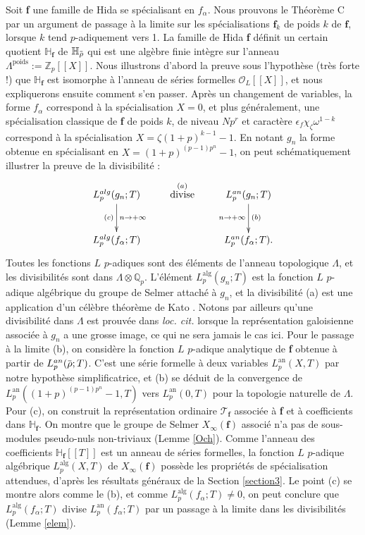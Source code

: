 \documentclass[12pt]{amsart}
\newcommand\bH{\mathbb{H}}
\newcommand\Zp{{\mathbb{Z}_{p}}}
\newcommand\Qp{\mathbb{Q}_{p}}
\newcommand\cO{\mathcal{O}}
\newcommand\cT{\mathcal{T}}
\newcommand{\ob}[1]{\mkern 1.5mu\overline{\mkern-1.5mu#1\mkern-1.5mu}\mkern 1.5mu}
\newcommand{\an}{\textrm{an}}
\newcommand{\alg}{\textrm{alg}}
\theoremstyle{defstyle}
\theoremstyle{thmstyle}
\begin{document}
Soit \textbf{f} une famille de Hida se spécialisant en $f_\alpha$. Nous prouvons le Théorème C par un argument de passage à la limite sur les spécialisations $\textbf{f}_k$ de poids $k$ de $\textbf{f}$, lorsque $k$ tend $p$-adiquement vers 1. La famille de Hida \textbf{f} définit un certain quotient $\bH_{\textbf{f}}$ de $\bH_{\ob{\rho}}$ qui est une algèbre finie intègre sur l'anneau $\Lambda^\textrm{poids}:=\Zp[[X]]$. Nous illustrons d'abord la preuve sous l'hypothèse (très forte !) que $\bH_{\textbf{f}}$ est isomorphe à l'anneau de séries formelles $\cO_L[[X]]$, et nous expliquerons ensuite comment s'en passer. Après un changement de variables, la forme $f_\alpha$ correspond à la spécialisation $X=0$, et plus généralement, une spécialisation classique de \textbf{f} de poids $k$, de niveau $Np^r$ et caractère $\epsilon_{f}\chi_\zeta\omega^{1-k}$ correspond à la spécialisation $X=\zeta (1+p)^{k-1}-1$. En notant $g_n$ la forme obtenue en spécialisant en $X=(1+p)^{(p-1)p^n}-1$, on peut schématiquement illustrer la preuve de la divisibilité :
$$
\xymatrix{
	L_p^{\alg}(g_n;T) \ar[d]_{(c)}^{n \rightarrow +\infty} & \stackrel{(a)}{\mbox{divise}} & L_p^{\an}(g_n;T) \ar[d]^{(b)}_{n \rightarrow +\infty} \\
	L_p^{\alg}(f_\alpha;T) & & L_p^{\an}(f_\alpha;T).
}
$$ 
Toutes les fonctions $L$ $p$-adiques sont des éléments de l'anneau topologique $\Lambda$, et les divisibilités sont dans $\Lambda\otimes \Qp$. L'élément $L_p^{\alg}(g_n;T)$ est la fonction $L$ $p$-adique algébrique du groupe de Selmer attaché à $g_n$, et la divisibilité (a) est une application d'un célèbre théorème de Kato \cite[Theorem 17.4]{kato2004p}. Notons par ailleurs qu'une divisibilité dans $\Lambda$ est prouvée dans \textit{loc. cit.} lorsque la représentation galoisienne associée à $g_n$ a une grosse image, ce qui ne sera jamais le cas ici. Pour le passage à la limite (b), on considère la fonction $L$ $p$-adique analytique de \textbf{f} obtenue à partir de $L_p^{\an}(\ob{\rho};T)$.  C'est une série formelle à deux variables $L_p^{\an}(X,T)$ par notre hypothèse simplificatrice, et (b) se déduit de la convergence de $L_p^{\an}((1+p)^{(p-1)p^n}-1,T)$ vers $L_p^{\an}(0,T)$ pour la topologie naturelle de $\Lambda$. Pour (c), on construit la représentation ordinaire $\cT_\textbf{f}$ associée à \textbf{f} et à coefficients dans $\bH_\textbf{f}$. On montre que le groupe de Selmer $X_\infty(\textbf{f})$ associé n'a pas de sous-modules pseudo-nuls non-triviaux (Lemme \ref{Och}). Comme l'anneau des coefficients $\bH_\textbf{f}[[T]]$ est un anneau de séries formelles, la fonction $L$ $p$-adique algébrique $L_p^{\alg}(X,T)$ de $X_\infty(\textbf{f})$ possède les propriétés de spécialisation attendues, d'après les résultats généraux de la Section \ref{section3}. Le point (c) se montre alors comme le (b), et comme $L_p^{\alg}(f_\alpha;T)\neq 0$, on peut conclure que $L_p^{\alg}(f_\alpha;T)$ divise $L_p^{\an}(f_\alpha;T)$ par un passage à la limite dans les divisibilités (Lemme \ref{elem}).
\end{document}
